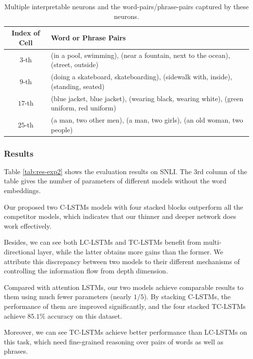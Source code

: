 \documentclass{article}
\begin{document}
\begin{table}[!t]
\centering
\begin{tabular}{|c|l|}
\hline
\textbf{Index of Cell} & \textbf{Word or Phrase Pairs} \\
\hline
$3$-th & (in a pool, swimming), (near a fountain, next to the ocean), (street, outside)\\
$9$-th & (doing a skateboard, skateboarding), (sidewalk with, inside), (standing, seated)\\
$17$-th & (blue jacket, blue jacket), (wearing black, wearing white), (green uniform, red uniform)\\
$25$-th & (a man, two other men), (a man, two girls), (an old woman, two people)\\ \hline
\end{tabular}
\caption{Multiple interpretable neurons and the word-pairs/phrase-pairs captured by these neurons.} \label{tab:exp-pair}
\end{table}

\subsubsection{Results}
Table \ref{tab:res-exp2} shows the evaluation results on SNLI.
The $3$rd column of the table gives the number of parameters of different models without the word embeddings.

Our proposed two C-LSTMs models with four stacked blocks outperform all the competitor models, which indicates that our thinner and deeper network does work effectively.

Besides, we can see both LC-LSTMs and TC-LSTMs benefit from multi-directional layer, while the latter obtains more gains than the former. We attribute this discrepancy between two models to their different mechanisms of controlling the information flow from depth dimension.

Compared with attention LSTMs, our two models achieve comparable results to them using much fewer parameters (nearly $1/5$).  By stacking C-LSTMs, the performance of them are improved significantly, and the four stacked TC-LSTMs achieve $85.1\%$ accuracy on this dataset.

Moreover, we can see TC-LSTMs achieve better performance than LC-LSTMs on this task, which need fine-grained reasoning over pairs of words as well as phrases.
\end{document}
